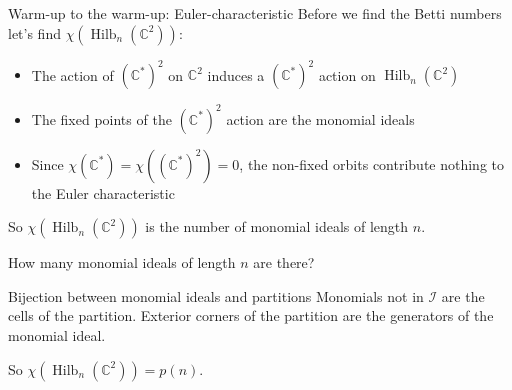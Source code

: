 \documentclass{beamer}
\DeclareMathOperator{\Hilb}{Hilb}
\newcommand{\C}{\mathbb{C}}
\begin{document}
\begin{frame}{Warm-up to the warm-up: Euler-characteristic }
Before we find the Betti numbers let's find $\chi(\Hilb_n(\C^2))$:  

\begin{itemize}
\item The action of $(\C^*)^2$ on $\C^2$ induces a $(\C^*)^2$ action on $\Hilb_n(\C^2)$
\item The fixed points of the $(\C^*)^2$ action are the monomial ideals 
\item Since $\chi(\C^*)=\chi((\C^*)^2)=0$, the non-fixed orbits contribute nothing to the Euler characteristic
\end{itemize}
So $\chi(\Hilb_n(\C^2))$ is the number of monomial ideals of length $n$.
\vspace{.5cm}
\begin{block}{How many monomial ideals of length $n$ are there?}\end{block}



\end{frame}






\begin{frame}{Bijection between monomial ideals and partitions}
Monomials not in $\mathcal{I}$ are the cells of the partition.
Exterior corners of the partition are the generators of the monomial ideal.

\begin{center}


\end{center}
So $\chi(\Hilb_n(\C^2))=p(n)$.
\end{frame}
\end{document}
